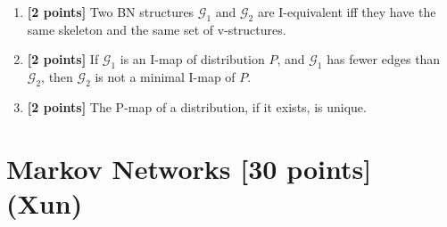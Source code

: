 \documentclass{article}
\newcommand{\Gcal}{\mathcal{G}}
\begin{document}
\begin{enumerate}




\item \textbf{[2 points]} Two BN structures $ \Gcal_1 $ and $ \Gcal_2 $ are I-equivalent iff they have the same skeleton and the same set of v-structures.







\item \textbf{[2 points]} 
If $\Gcal_1$ is an I-map of distribution $P$, and $\Gcal_1$ has fewer edges than $\Gcal_2$, then $\Gcal_2$ is not a minimal I-map of $P$.





\item \textbf{[2 points]} The P-map of a distribution, if it exists, is unique. 






\end{enumerate}

























\newpage


\section{Markov Networks [30 points] (Xun)}


\newcommand{\horbar}{\rule[.5ex]{2.5ex}{0.5pt}}
\newcommand{\verbar}{\rule[-1ex]{0.5pt}{2.5ex}}
\newcommand{\Xbf}{\mathbf{X}}
\newcommand{\var}{\text{Var}}
\newcommand{\cov}{\text{Cov}}
\newcommand{\mubf}{\boldsymbol{\mu}}
\end{document}
